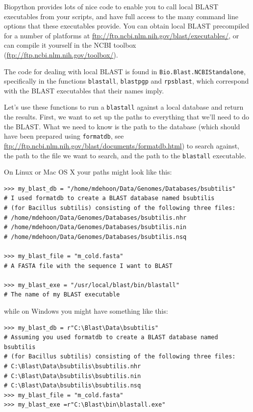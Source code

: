 \documentclass{report}
\begin{document}
Biopython provides lots of nice code to enable you to call local BLAST executables from your scripts, and have full access to the many command line options that these executables provide. You can obtain local BLAST precompiled for a number of platforms at \url{ftp://ftp.ncbi.nlm.nih.gov/blast/executables/}, or can compile it yourself in the NCBI toolbox (\url{ftp://ftp.ncbi.nlm.nih.gov/toolbox/}).

The code for dealing with local BLAST is found in \verb|Bio.Blast.NCBIStandalone|, specifically in the functions \verb|blastall|, \verb|blastpgp| and \verb|rpsblast|, which correspond with the BLAST executables that their names imply.

Let's use these functions to run a \verb|blastall| against a local database and return the results. First, we want to set up the paths to everything that we'll need to do the BLAST. What we need to know is the path to the database (which should have been prepared using \verb|formatdb|, see \url{ftp://ftp.ncbi.nlm.nih.gov/blast/documents/formatdb.html}) to search against, the path to the file we want to search, and the path to the \verb|blastall| executable.

On Linux or Mac OS X your paths might look like this:

\begin{verbatim}
>>> my_blast_db = "/home/mdehoon/Data/Genomes/Databases/bsubtilis"
# I used formatdb to create a BLAST database named bsubtilis
# (for Bacillus subtilis) consisting of the following three files:
# /home/mdehoon/Data/Genomes/Databases/bsubtilis.nhr
# /home/mdehoon/Data/Genomes/Databases/bsubtilis.nin
# /home/mdehoon/Data/Genomes/Databases/bsubtilis.nsq

>>> my_blast_file = "m_cold.fasta"
# A FASTA file with the sequence I want to BLAST

>>> my_blast_exe = "/usr/local/blast/bin/blastall"
# The name of my BLAST executable
\end{verbatim}

\noindent while on Windows you might have something like this:

\begin{verbatim}
>>> my_blast_db = r"C:\Blast\Data\bsubtilis"
# Assuming you used formatdb to create a BLAST database named bsubtilis
# (for Bacillus subtilis) consisting of the following three files:
# C:\Blast\Data\bsubtilis\bsubtilis.nhr
# C:\Blast\Data\bsubtilis\bsubtilis.nin
# C:\Blast\Data\bsubtilis\bsubtilis.nsq
>>> my_blast_file = "m_cold.fasta"
>>> my_blast_exe =r"C:\Blast\bin\blastall.exe"
\end{verbatim}
\end{document}
